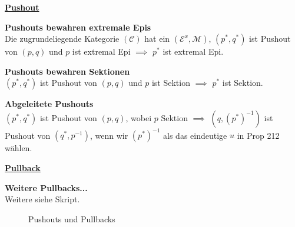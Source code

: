 \newpage 

\begin{multicols}{2}

\textbf{\underline{Pushout}} 

\textbf{ Pushouts bewahren extremale Epis} \\
Die zugrundeliegende Kategorie $(\mathcal{C})$ hat ein $(\mathcal{E}^x, \mathcal{M})$, $(p^*, q^*)$ ist Pushout von $(p,q)$ und $p$ ist extremal Epi $\implies$ $p^*$ ist extremal Epi.

\textbf{ Pushouts bewahren Sektionen} \\
$(p^*, q^*)$ ist Pushout von $(p,q)$ und $p$ ist Sektion $\implies $ $p^*$ ist Sektion.

\textbf{ Abgeleitete Pushouts} \\
$(p^*, q^*)$ ist Pushout von $(p,q)$, wobei $p$ Sektion $\implies$ $\left ( q, (p^*)^{-1} \right )$ ist Pushout von $(q^*, p^{-1})$, wenn wir $(p^*)^{-1}$ als das eindeutige $u$ in Prop 212 wählen.

\columnbreak

\textbf{\underline{Pullback}} 

\textbf{Weitere Pullbacks...} \\
Weitere siehe Skript.

\end{multicols}


\begin{figure}[h]
\centering
{} \qquad \qquad \qquad
{}
\caption{Pushouts und Pullbacks}
\end{figure}

